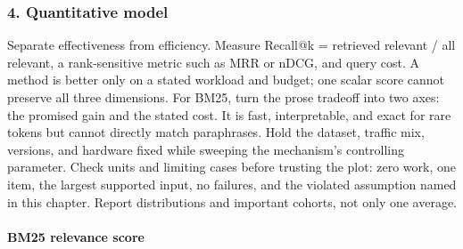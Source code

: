 \subsubsection*{4. Quantitative model}
Separate effectiveness from efficiency. Measure Recall@k = retrieved relevant / all relevant, a rank-sensitive metric such as MRR or nDCG, and query cost. A method is better only on a stated workload and budget; one scalar score cannot preserve all three dimensions.
For BM25, turn the prose tradeoff into two axes: the promised gain and the stated cost. It is fast, interpretable, and exact for rare tokens but cannot directly match paraphrases. Hold the dataset, traffic mix, versions, and hardware fixed while sweeping the mechanism's controlling parameter.
Check units and limiting cases before trusting the plot: zero work, one item, the largest supported input, no failures, and the violated assumption named in this chapter. Report distributions and important cohorts, not only one average.
\paragraph{BM25 relevance score}
